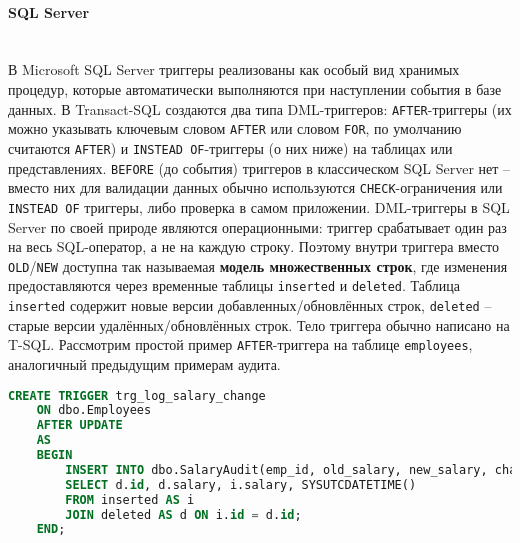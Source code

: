  \paragraph{\textbf{SQL Server}} ~\\
 В Microsoft SQL Server триггеры реализованы как особый вид хранимых процедур, которые автоматически выполняются при наступлении события в базе данных. В Transact-SQL создаются два типа DML-триггеров: \texttt{AFTER}-триггеры (их можно указывать ключевым словом \texttt{AFTER} или словом \texttt{FOR}, по умолчанию считаются \texttt{AFTER}) и \texttt{INSTEAD OF}-триггеры (о них ниже) на таблицах или представлениях. \texttt{BEFORE} (до события) триггеров в классическом SQL Server нет – вместо них для валидации данных обычно используются \texttt{CHECK}-ограничения или \texttt{INSTEAD OF} триггеры, либо проверка в самом приложении. DML-триггеры в SQL Server по своей природе являются операционными: триггер срабатывает один раз на весь SQL-оператор, а не на каждую строку. Поэтому внутри триггера вместо \texttt{OLD}/\texttt{NEW} доступна так называемая \textbf{модель множественных строк}, где изменения предоставляются через временные таблицы \texttt{inserted} и \texttt{deleted}. Таблица \texttt{inserted} содержит новые версии добавленных/обновлённых строк, \texttt{deleted} – старые версии удалённых/обновлённых строк. Тело триггера обычно написано на T-SQL. Рассмотрим простой пример \texttt{AFTER}-триггера на таблице \texttt{employees}, аналогичный предыдущим примерам аудита.

 \begin{lstlisting}[language=SQL]
    CREATE TRIGGER trg_log_salary_change
    ON dbo.Employees
    AFTER UPDATE
    AS
    BEGIN
        INSERT INTO dbo.SalaryAudit(emp_id, old_salary, new_salary, changed_at)
        SELECT d.id, d.salary, i.salary, SYSUTCDATETIME()
        FROM inserted AS i
        JOIN deleted AS d ON i.id = d.id;
    END;
 \end{lstlisting}

